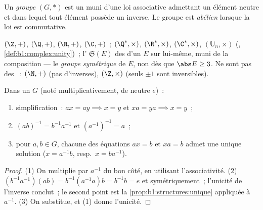 \begin{definition}[Groupe]\label{def:b1:structures:group}
Un \emph{groupe} $(G, *)$ est un  muni d'une loi
associative admettant un élément neutre et dans lequel tout élément
possède un inverse. Le groupe est \emph{abélien}
lorsque la loi est commutative.
\end{definition}

\begin{example}\label{ex:b1:structures:groups}
$(\Z, +)$, $(\Q, +)$, $(\R, +)$, $(\C, +)$~; $(\Q^*, \times)$,
$(\R^*, \times)$, $(\C^*, \times)$, $(\mathbb{U}_n, \times)$ (, \cref{def:b1:complex:unity})~; l' $\mathfrak{S}(E)$ des
 d'un  $E$ sur lui-même, muni de la composition --- le
\emph{groupe symétrique} de $E$, non  dès
que $\abs E \geq 3$. Ne sont pas des ~: $(\N, +)$ (pas
d'inverses), $(\Z, \times)$ (seuls $\pm 1$ sont inversibles).
\end{example}

\begin{proposition}\label{prop:b1:structures:rules}
Dans un  $G$ (noté multiplicativement, de neutre $e$)~:
\begin{enumerate}
  \item simplification~: $ax = ay \implies x = y$ et $xa = ya \implies
        x = y$~;
  \item $(ab)^{-1} = b^{-1} a^{-1}$ et $(a^{-1})^{-1} = a$~;
  \item pour $a, b \in G$, chacune des équations $ax = b$ et $xa = b$
        admet une unique solution ($x = a^{-1}b$, resp.\ $x = b a^{-1}$).
\end{enumerate}
\end{proposition}

\begin{proof}
(1) On multiplie par $a^{-1}$ du bon côté, en utilisant
l'associativité. (2) $(b^{-1}a^{-1})(ab) = b^{-1}(a^{-1}a)b = b^{-1}b =
e$ et symétriquement~; l'unicité de l'inverse conclut~; le second
point est la \cref{prop:b1:structures:unique} appliquée à $a^{-1}$. (3) On
substitue, et (1) donne l'unicité.
\end{proof}

